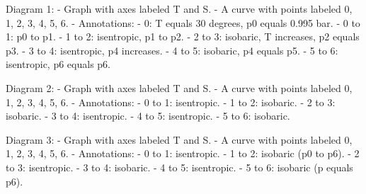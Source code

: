 Diagram 1: 
- Graph with axes labeled T and S. 
- A curve with points labeled 0, 1, 2, 3, 4, 5, 6. 
- Annotations: 
  - 0: T equals 30 degrees, p0 equals 0.995 bar.
  - 0 to 1: p0 to p1.
  - 1 to 2: isentropic, p1 to p2.
  - 2 to 3: isobaric, T increases, p2 equals p3.
  - 3 to 4: isentropic, p4 increases.
  - 4 to 5: isobaric, p4 equals p5.
  - 5 to 6: isentropic, p6 equals p6.

Diagram 2:
- Graph with axes labeled T and S.
- A curve with points labeled 0, 1, 2, 3, 4, 5, 6.
- Annotations:
  - 0 to 1: isentropic.
  - 1 to 2: isobaric.
  - 2 to 3: isobaric.
  - 3 to 4: isentropic.
  - 4 to 5: isentropic.
  - 5 to 6: isobaric.

Diagram 3:
- Graph with axes labeled T and S.
- A curve with points labeled 0, 1, 2, 3, 4, 5, 6.
- Annotations:
  - 0 to 1: isentropic.
  - 1 to 2: isobaric (p0 to p6).
  - 2 to 3: isentropic.
  - 3 to 4: isobaric.
  - 4 to 5: isentropic.
  - 5 to 6: isobaric (p equals p6).